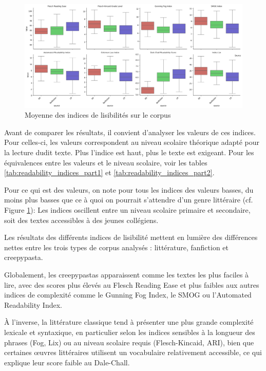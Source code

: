 \documentclass[12pt,a4paper,oneside,titlepage]{book} %
\begin{document}
	\begin{figure}
\centering
\includegraphics[width = \textwidth]{illustration/readability_per_source.png}
\caption{Moyenne des indices de lisibilités sur le corpus}
\label{fig:mean_readbility}
	\end{figure}
	
	Avant de comparer les résultats, il convient d'analyser les valeurs de ces indices. Pour celles-ci, les valeurs correspondent au niveau scolaire théorique adapté pour la lecture dudit texte. Plus l'indice est haut, plus le texte est exigeant. Pour les équivalences entre les valeurs et le niveau scolaire, voir les tables \ref{tab:readability_indices_part1} et \ref{tab:readability_indices_part2}.
	

	Pour ce qui est des valeurs, on note pour tous les indices des valeurs basses, du moins plus basses que ce à quoi on pourrait s'attendre d'un genre littéraire (cf. Figure \ref{fig:mean_readbility}): Les indices oscillent entre un niveau scolaire primaire et secondaire, soit des textes accessibles à des jeunes collégiens.


Les résultats des différents indices de lisibilité mettent en lumière des différences nettes entre les trois types de corpus analysés : littérature, fanfiction et creepypasta. 

Globalement, les creepypastas apparaissent comme les textes les plus faciles à lire, avec des scores plus élevés au Flesch Reading Ease et plus faibles aux autres indices de complexité comme le Gunning Fog Index, le SMOG ou l’Automated Readability Index.

À l’inverse, la littérature classique tend à présenter une plus grande complexité lexicale et syntaxique, en particulier selon les indices sensibles à la longueur des phrases (Fog, Lix) ou au niveau scolaire requis (Flesch-Kincaid, ARI), bien que certaines œuvres littéraires utilisent un vocabulaire relativement accessible, ce qui explique leur score faible au Dale-Chall. 
\end{document}
